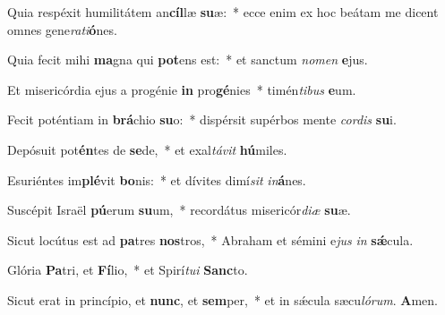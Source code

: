 ﻿\setcounter{enumi}{2}
\item Quia respéxit humilitátem an\textbf{cíl}læ \textbf{su}æ:~* ecce enim ex hoc beátam me dicent omnes gene\textit{ra}\textit{ti}\textbf{ó}nes.

\item Quia fecit mihi \textbf{ma}gna qui \textbf{pot}ens est:~* et sanctum \textit{no}\textit{men} \textbf{e}jus.

\item Et misericórdia ejus a progénie \textbf{in} pro\textbf{gé}nies~* timén\textit{ti}\textit{bus} \textbf{e}um.

\item Fecit poténtiam in \textbf{brá}chio \textbf{su}o:~* dispérsit supérbos mente \textit{cor}\textit{dis} \textbf{su}i.

\item Depósuit pot\textbf{én}tes de \textbf{se}de,~* et exal\textit{tá}\textit{vit} \textbf{hú}miles.

\item Esuriéntes im\textbf{plé}vit \textbf{bo}nis:~* et dívites dimí\textit{sit} \textit{in}\textbf{á}nes.

\item Suscépit Israël \textbf{pú}erum \textbf{su}um,~* recordátus misericór\textit{di}\textit{æ} \textbf{su}æ.

\item Sicut locútus est ad \textbf{pa}tres \textbf{nos}tros,~* Abraham et sémini e\textit{jus} \textit{in} \textbf{sǽ}cula.

\item Glória \textbf{Pa}tri, et \textbf{Fí}lio,~* et Spirí\textit{tu}\textit{i} \textbf{Sanc}to.

\item Sicut erat in princípio, et \textbf{nunc}, et \textbf{sem}per,~* et in sǽcula sæcu\textit{ló}\textit{rum}. \textbf{A}men.